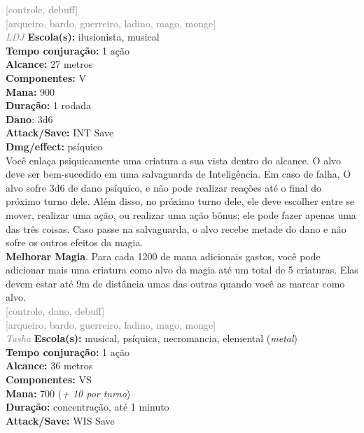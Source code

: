 \documentclass{RPG_Adventure}[2021/10/20]
\begin{document}
{\scriptsize \textcolor{gray}{[controle, debuff]\\}}
{\scriptsize \textcolor{gray}{[arqueiro, bardo, guerreiro, ladino, mago, monge]\\}}
{\tiny \textcolor{gray}{\textit{LDJ}}}\jump{}
{\small \t \textbf{Escola(s):} ilusionista, musical\\\t \textbf{Tempo conjuração:} 1 ação\\\t \textbf{Alcance:} 27 metros\\\t \textbf{Componentes:} V\\\t \textbf{Mana:} 900\\\t \textbf{Duração:} 1 rodada\\\t \textbf{Dano}: 3d6\\\t \textbf{Attack/Save:} INT Save\\\t \textbf{Dmg/effect:} psíquico\\}
{\normalsize Você enlaça psiquicamente uma criatura a sua vista dentro do alcance. O alvo deve ser bem-sucedido em uma salvaguarda de Inteligência. Em caso de falha, O alvo sofre 3d6 de dano psíquico, e não pode realizar reações até o final do próximo turno dele. Além disso, no próximo turno dele, ele deve escolher entre se mover, realizar uma ação, ou realizar uma ação bônus; ele pode fazer apenas uma das três coisas. Caso passe na salvaguarda, o alvo recebe metade do dano e não sofre os outros efeitos da magia.\\\t \textbf{Melhorar Magia}. Para cada 1200 de mana adicionais gastos, você pode adicionar mais uma criatura como alvo da magia até um total de 5 criaturas. Elas devem estar até 9m de distância umas das outras quando você as marcar como alvo.\\}
{\scriptsize \textcolor{gray}{[controle, dano, debuff]\\}}
{\scriptsize \textcolor{gray}{[arqueiro, bardo, guerreiro, ladino, mago, monge]\\}}
{\tiny \textcolor{gray}{\textit{Tasha}}}\jump{}
{\small \t \textbf{Escola(s):} musical, psíquica, necromancia, elemental (\textit{metal})\\\t \textbf{Tempo conjuração:} 1 ação\\\t \textbf{Alcance:} 36 metros\\\t \textbf{Componentes:} VS\\\t \textbf{Mana:} 700 (\textit{+ 10 por turno})\\\t \textbf{Duração:} concentração, até 1 minuto\\\t \textbf{Attack/Save:} WIS Save\\}
\end{document}
